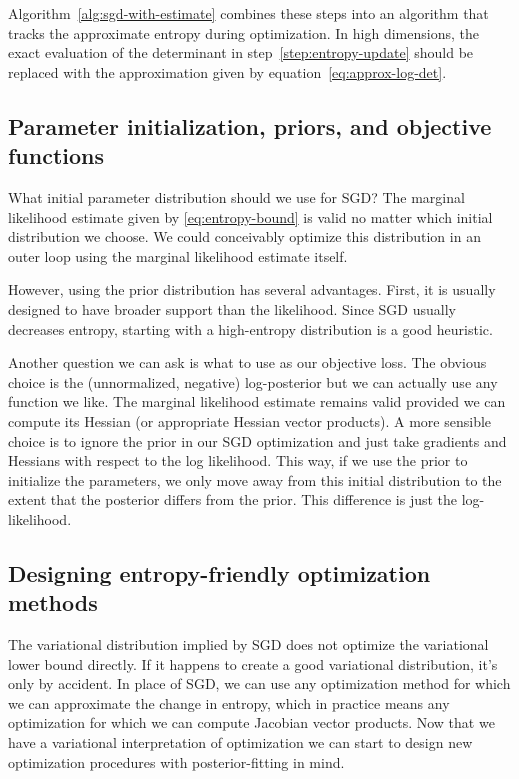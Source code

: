 \documentclass[]{article}
\begin{document}
Algorithm~\ref{alg:sgd-with-estimate} combines these steps into an algorithm that tracks the approximate entropy during optimization.
In high dimensions, the exact evaluation of the determinant in step~\ref{step:entropy-update} should be replaced with the approximation given by equation~\eqref{eq:approx-log-det}.


\subsection{Parameter initialization, priors, and objective functions}

What initial parameter distribution should we use for SGD?
The marginal likelihood estimate given by \eqref{eq:entropy-bound} is valid no matter which initial distribution we choose.
We could conceivably optimize this distribution in an outer loop using the marginal likelihood estimate itself.

However, using the prior distribution has several advantages.
First, it is usually designed to have broader support than the likelihood.
Since SGD usually decreases entropy, starting with a high-entropy distribution
is a good heuristic.

Another question we can ask is what to use as our objective loss. The obvious choice is the (unnormalized, negative) log-posterior but we can actually use any function we like.
The marginal likelihood estimate remains valid provided we can compute its Hessian
(or appropriate Hessian vector products). A more sensible choice is to ignore the prior
in our SGD optimization and just take gradients and Hessians with respect to the log likelihood.
This way, if we use the prior to initialize the parameters, we only move away from this
initial distribution to the extent that the posterior differs from the prior.
This difference is just the log-likelihood.

\subsection{Designing entropy-friendly optimization methods}

The variational distribution implied by SGD does not optimize the variational lower bound directly.
If it happens to create a good variational distribution, it's only by accident.
In place of SGD, we can use any optimization method for which we can approximate the change in entropy, which in practice means any optimization for which we can compute Jacobian vector products.
Now that we have a variational interpretation of optimization we can start to design new 
optimization procedures with posterior-fitting in mind.
\end{document}
